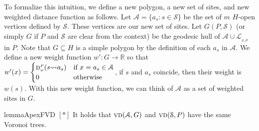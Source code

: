 \documentclass[a4paper,UKenglish]{socg-lipics-v2018}
\newcommand{\s}{\mathcal S}
\newcommand{\g}[3][P]{\ensuremath{\textsc{g}^{\scriptscriptstyle #1}(#2, #3)}}
\newcommand{\dd}[3][P]{\ensuremath{\textsc{d}_{\scriptscriptstyle w}^{\scriptscriptstyle #1}(#2 {\leadsto} #3)}}
\newcommand{\ddw}[3][P]{\ensuremath{\textsc{d}_{\scriptscriptstyle w'}^{\scriptscriptstyle #1}(#2 {\leadsto} #3)}}
\newcommand{\p}[3][P]{\ensuremath{\pi_{_{#1}}(#2, #3)}}
\newcommand{\cell}[2][P]{\ensuremath{\mathtt{Cell}_{\scriptscriptstyle #1}(#2)}}
\newcommand{\vd}[2][P]{\textsc{vd}(#2, #1)}
\newcommand{\LL}[1][\s, P]{\ensuremath{\mathcal L_{_{#1}}}}
\newcommand{\A}{\ensuremath{\mathcal A}}
\begin{document}
To formalize this intuition, we define a new polygon, a new set of sites, and new weighted distance function as follows.
Let $\A = \{a_s: s\in \s\}$ be the set of $m$ $H$-open vertices defined by $\s$. These vertices are our new set of sites.
Let $G(P, \s)$ (or simply $G$ if $P$ and $\s$ are clear from the context) be the geodesic hull of $\A\cup \LL$ in $P$.
Note that $G\subseteq H$ is a simple polygon by the definition of each $a_s$ in $\A$.
We define a new weight function $w':G\to \mathbb{R}$ so that $w'(x) = \begin{cases} \dd{s}{a_s}& \text{if }x=a_s\in \A \\ 0&\text{otherwise} \end{cases}$,  if $s$ and $a_s$ coincide, then their weight is $w(s)$.
With this new weight function, we can think of $\A$ as a set of weighted sites in $G$.

\begin{restatable}{lemma}{ApexFVD}\label{lemma:ApexFVD}
\hyperref[ProofApexFVD]{$[*]$}
It holds that $\vd[G]{\A}$ and $\vd[P]{\s}$ have the same Voronoi trees.
\end{restatable}
\newcommand{\ProofApexFVD}{
\ApexFVD* 
\begin{proof}\label{ProofApexFVD}
\hyperref[lemma:ApexFVD]{$\hookleftarrow$}
Notice that $G$ is a subset of $H$ such that $int(G)\subset int(H)$.
Let $s$ be a site of $\s$ and let $x\in G$. 
Because $G$ is a geodesically convex subset of $P$, and since $a_s, x\in G$, we know that $\p[G]{a_s}{x} = \p{a_s}{x}$, and hence the length of these paths is simply $\g{a_s}{x}$ . 
Therefore, we know that  $\ddw[G]{a_s}{x} = w'(a_s) + \g{a_s}{x} = \dd{s}{a_s} + \g{a_s}{x} = \dd{s}{x}$.
That is, the $w'$-distance from any site in $a_s \in \A$ to any point $x$ in $G$ is the same as the $w$-distance from the corresponding site in $s\in \s$ to the same point $x$ in $P$, which implies that $\cell[G]{s, \s} \subseteq \cell{s, \s}$. 
Because this happens for each Voronoi cell of $\s$ in $G$, the Voronoi trees coincide. 
\end{proof}
}
\end{document}
